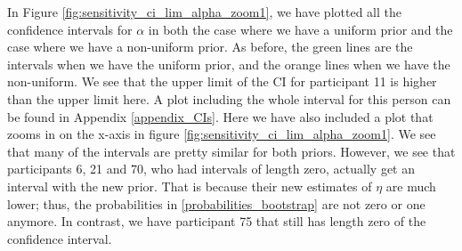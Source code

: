 In Figure \ref{fig:sensitivity_ci_lim_alpha_zoom1}, we have plotted all the confidence intervals for $\alpha$ in both the case where we have a uniform prior and the case where we have a non-uniform prior. As before, the green lines are the intervals when we have the uniform prior, and the orange lines when we have the non-uniform. We see that the upper limit of the CI for participant 11 is higher than the upper limit here. A plot including the whole interval for this person can be found in Appendix \ref{appendix_CIs}. Here we have also included a plot that zooms in on the x-axis in figure \ref{fig:sensitivity_ci_lim_alpha_zoom1}.
We see that many of the intervals are pretty similar for both priors. However, we see that participants 6, 21 and 70, who had intervals of length zero, actually get an interval with the new prior. That is because their new estimates of $\eta$ are much lower; thus, the probabilities in \eqref{probabilities_bootstrap} are not zero or one anymore. In contrast, we have participant 75 that still has length zero of the confidence interval.
